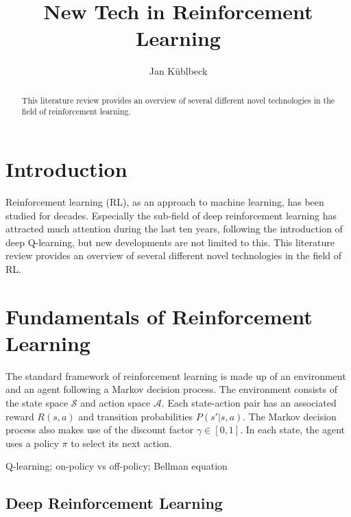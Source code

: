 \documentclass[runningheads]{llncs}
\begin{document}
%
\title{New Tech in Reinforcement Learning}
%
%
\author{Jan Küblbeck}
%
%
%
\maketitle              %
%
\begin{abstract}
This literature review provides an overview of several different novel technologies in the field of reinforcement learning. %
\end{abstract}
%
%
%
\section{Introduction}

Reinforcement learning (RL), as an approach to machine learning, has been studied for decades. Especially the sub-field of deep reinforcement learning has attracted much attention during the last ten years, following the introduction of deep Q-learning, but new developments are not limited to this. This literature review provides an overview of several different novel technologies in the field of RL.

\section{Fundamentals of Reinforcement Learning}

The standard framework of reinforcement learning \cite{sutton2018reinforcement} is made up of an environment and an agent following a Markov decision process. The environment consists of the state space $\mathcal{S}$ and action space $\mathcal{A}$. Each state-action pair has an associated reward $R(s,a)$ and transition probabilities $P(s'|s,a)$. The Markov decision process also makes use of the discount factor $\gamma \in [0,1]$. In each state, the agent uses a policy $\pi$ to select its next action.

Q-learning; on-policy vs off-policy; Bellman equation %

\subsection{Deep Reinforcement Learning}
\end{document}
